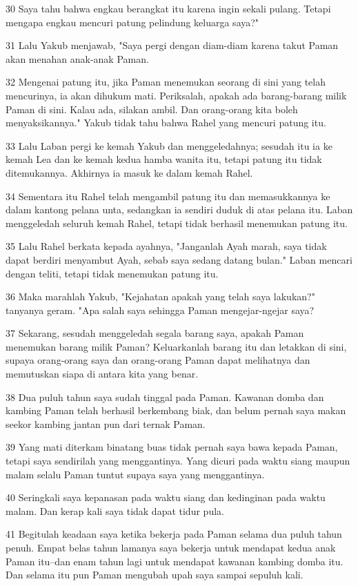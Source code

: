 \par 30 Saya tahu bahwa engkau berangkat itu karena ingin sekali pulang. Tetapi mengapa engkau mencuri patung pelindung keluarga saya?"
\par 31 Lalu Yakub menjawab, "Saya pergi dengan diam-diam karena takut Paman akan menahan anak-anak Paman.
\par 32 Mengenai patung itu, jika Paman menemukan seorang di sini yang telah mencurinya, ia akan dihukum mati. Periksalah, apakah ada barang-barang milik Paman di sini. Kalau ada, silakan ambil. Dan orang-orang kita boleh menyaksikannya." Yakub tidak tahu bahwa Rahel yang mencuri patung itu.
\par 33 Lalu Laban pergi ke kemah Yakub dan menggeledahnya; sesudah itu ia ke kemah Lea dan ke kemah kedua hamba wanita itu, tetapi patung itu tidak ditemukannya. Akhirnya ia masuk ke dalam kemah Rahel.
\par 34 Sementara itu Rahel telah mengambil patung itu dan memasukkannya ke dalam kantong pelana unta, sedangkan ia sendiri duduk di atas pelana itu. Laban menggeledah seluruh kemah Rahel, tetapi tidak berhasil menemukan patung itu.
\par 35 Lalu Rahel berkata kepada ayahnya, "Janganlah Ayah marah, saya tidak dapat berdiri menyambut Ayah, sebab saya sedang datang bulan." Laban mencari dengan teliti, tetapi tidak menemukan patung itu.
\par 36 Maka marahlah Yakub, "Kejahatan apakah yang telah saya lakukan?" tanyanya geram. "Apa salah saya sehingga Paman mengejar-ngejar saya?
\par 37 Sekarang, sesudah menggeledah segala barang saya, apakah Paman menemukan barang milik Paman? Keluarkanlah barang itu dan letakkan di sini, supaya orang-orang saya dan orang-orang Paman dapat melihatnya dan memutuskan siapa di antara kita yang benar.
\par 38 Dua puluh tahun saya sudah tinggal pada Paman. Kawanan domba dan kambing Paman telah berhasil berkembang biak, dan belum pernah saya makan seekor kambing jantan pun dari ternak Paman.
\par 39 Yang mati diterkam binatang buas tidak pernah saya bawa kepada Paman, tetapi saya sendirilah yang menggantinya. Yang dicuri pada waktu siang maupun malam selalu Paman tuntut supaya saya yang menggantinya.
\par 40 Seringkali saya kepanasan pada waktu siang dan kedinginan pada waktu malam. Dan kerap kali saya tidak dapat tidur pula.
\par 41 Begitulah keadaan saya ketika bekerja pada Paman selama dua puluh tahun penuh. Empat belas tahun lamanya saya bekerja untuk mendapat kedua anak Paman itu--dan enam tahun lagi untuk mendapat kawanan kambing domba itu. Dan selama itu pun Paman mengubah upah saya sampai sepuluh kali.
